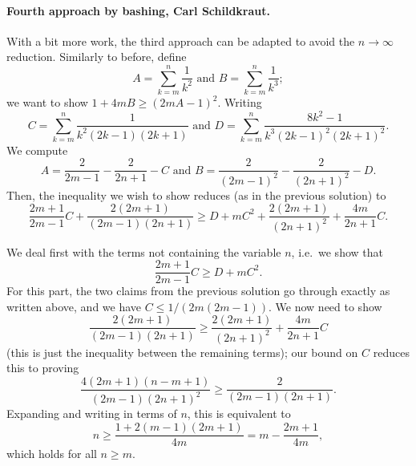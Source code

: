 \paragraph{Fourth approach by bashing, Carl Schildkraut.}
With a bit more work, the third approach can be adapted to avoid the $n\to\infty$ reduction.
Similarly to before, define
\[ A=\sum_{k=m}^n\frac1{k^2}\text{ and }B=\sum_{k=m}^n \frac1{k^3}; \]
we want to show $1+4mB\geq (2mA-1)^2$. Writing
\[ C=\sum_{k=m}^n\frac1{k^2(2k-1)(2k+1)}
  \text{ and }D=\sum_{k=m}^n \frac{8k^2-1}{k^3(2k-1)^2(2k+1)^2}. \]
We compute
\[ A=\frac2{2m-1}-\frac2{2n+1}-C \text{ and } B=\frac2{(2m-1)^2}-\frac2{(2n+1)^2}-D. \]
Then, the inequality we wish to show reduces (as in the previous solution) to
\[
  \frac{2m+1}{2m-1}C+\frac{2(2m+1)}{(2m-1)(2n+1)}
  \geq D+mC^2+\frac{2(2m+1)}{(2n+1)^2}+\frac{4m}{2n+1}C.
\]

We deal first with the terms not containing the variable $n$, i.e.\ we show that
\[ \frac{2m+1}{2m-1}C\geq D+mC^2. \]
For this part, the two claims from the previous solution go through exactly
as written above, and we have $C\leq 1/(2m(2m-1))$.
We now need to show
\[ \frac{2(2m+1)}{(2m-1)(2n+1)} \geq \frac{2(2m+1)}{(2n+1)^2}+\frac{4m}{2n+1}C \]
(this is just the inequality between the remaining terms);
our bound on $C$ reduces this to proving
\[\frac{4(2m+1)(n-m+1)}{(2m-1)(2n+1)^2}\geq \frac2{(2m-1)(2n+1)}.\]
Expanding and writing in terms of $n$, this is equivalent to
\[n\geq \frac{1+2(m-1)(2m+1)}{4m}=m-\frac{2m+1}{4m},\]
which holds for all $n\geq m$.
